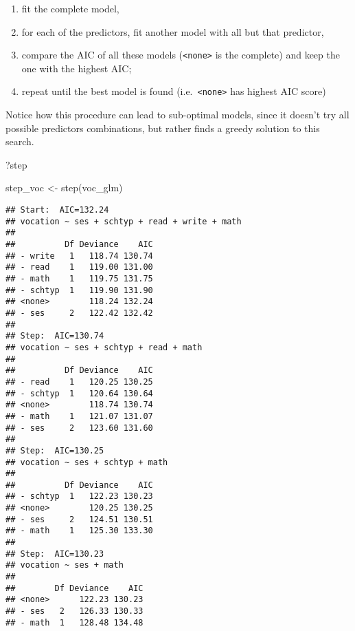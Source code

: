 \documentclass[
  oneside]{book}
\newenvironment{Shaded}{\begin{snugshade}}{\end{snugshade}}
\newcommand{\FunctionTok}[1]{\textcolor[rgb]{0.00,0.00,0.00}{#1}}
\newcommand{\NormalTok}[1]{#1}
\newcommand{\OtherTok}[1]{\textcolor[rgb]{0.56,0.35,0.01}{#1}}
\providecommand{\tightlist}{%
  \setlength{\itemsep}{0pt}\setlength{\parskip}{0pt}}
\begin{document}
\begin{enumerate}
\def\labelenumi{\arabic{enumi}.}
\tightlist
\item
  fit the complete model,
\item
  for each of the predictors, fit another model with all but that predictor,
\item
  compare the AIC of all these models (\texttt{\textless{}none\textgreater{}} is the complete) and keep the
  one with the highest AIC;
\item
  repeat until the best model is found (i.e.~\texttt{\textless{}none\textgreater{}} has highest AIC
  score)
\end{enumerate}

Notice how this procedure can lead to sub-optimal models, since it doesn't try
all possible predictors combinations, but rather finds a greedy solution to this
search.

\begin{Shaded}
\begin{Highlighting}[]
\NormalTok{?step}
\end{Highlighting}
\end{Shaded}

\begin{Shaded}
\begin{Highlighting}[]
\NormalTok{step\_voc }\OtherTok{\textless{}{-}} \FunctionTok{step}\NormalTok{(voc\_glm)}
\end{Highlighting}
\end{Shaded}

\begin{verbatim}
## Start:  AIC=132.24
## vocation ~ ses + schtyp + read + write + math
## 
##          Df Deviance    AIC
## - write   1   118.74 130.74
## - read    1   119.00 131.00
## - math    1   119.75 131.75
## - schtyp  1   119.90 131.90
## <none>        118.24 132.24
## - ses     2   122.42 132.42
## 
## Step:  AIC=130.74
## vocation ~ ses + schtyp + read + math
## 
##          Df Deviance    AIC
## - read    1   120.25 130.25
## - schtyp  1   120.64 130.64
## <none>        118.74 130.74
## - math    1   121.07 131.07
## - ses     2   123.60 131.60
## 
## Step:  AIC=130.25
## vocation ~ ses + schtyp + math
## 
##          Df Deviance    AIC
## - schtyp  1   122.23 130.23
## <none>        120.25 130.25
## - ses     2   124.51 130.51
## - math    1   125.30 133.30
## 
## Step:  AIC=130.23
## vocation ~ ses + math
## 
##        Df Deviance    AIC
## <none>      122.23 130.23
## - ses   2   126.33 130.33
## - math  1   128.48 134.48
\end{verbatim}
\end{document}
